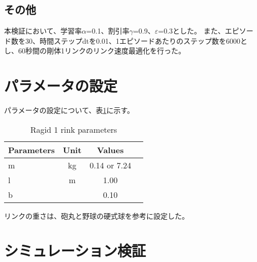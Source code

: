 \subsection{その他}
本検証において、学習率$\alpha$=0.1、割引率$\gamma$=0.9、$\varepsilon$=0.3とした。
また、エピソード数を30、時間ステップdtを0.01、1エピソードあたりのステップ数を6000とし、60秒間の剛体1リンクのリンク速度最適化を行った。
\section{パラメータの設定}
パラメータの設定について、表\ref{1_link}に示す。
\begin{table}[tb]
  \label{1_link}
  \begin{center}
    \caption{Ragid 1 rink parameters}
    \begin{tabular}{l|c|c|r}
      \hline
      Parameters & Unit & Values \\
      \hline
      m & kg & 0.14 or 7.24 \\
      l & m & 1.00 \\
      b &  & 0.10 \\
      \hline
    \end{tabular}
  \end{center}
\end{table}
リンクの重さは、砲丸と野球の硬式球を参考に設定した。
\section{シミュレーション検証}

